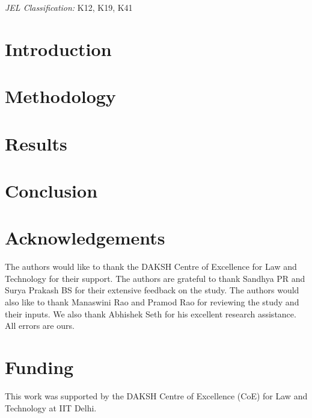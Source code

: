 \documentclass[12pt,a4paper]{article}
\begin{document}
\textit{JEL Classification:} K12, K19, K41  

\newpage
\tableofcontents

\newpage
\printglossaries

\newpage
\listoftables

\newpage
\section{Introduction}
\label{sec:introduction}


\section{Methodology}
\label{sec:methodology}


\section{Results}
\label{sec:results}


\section{Conclusion}
\label{sec:conclusion}


\section*{Acknowledgements}
The authors would like to thank the DAKSH Centre of Excellence for Law and Technology for their support. The authors are grateful to thank Sandhya PR and Surya Prakash BS for their extensive feedback on the study. The authors would also like to thank Manaswini Rao and Pramod Rao for reviewing the study and their inputs. We also thank Abhishek Seth for his excellent research assistance. All errors are ours.

\section*{Funding}
This work was supported by the DAKSH Centre of Excellence (CoE) for Law and Technology at IIT Delhi.

\newpage
\printbibliography[heading=bibintoc]

\newpage
\begin{appendices}

\end{appendices}
\end{document}
